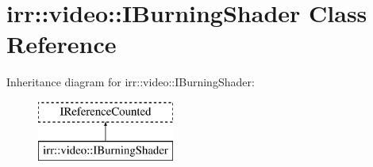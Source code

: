 \hypertarget{classirr_1_1video_1_1_i_burning_shader}{\section{irr\-:\-:video\-:\-:I\-Burning\-Shader Class Reference}
\label{classirr_1_1video_1_1_i_burning_shader}
}
Inheritance diagram for irr\-:\-:video\-:\-:I\-Burning\-Shader\-:\begin{figure}[H]
\begin{center}
\leavevmode
\includegraphics[height=2.000000cm]{classirr_1_1video_1_1_i_burning_shader}
\end{center}
\end{figure}
